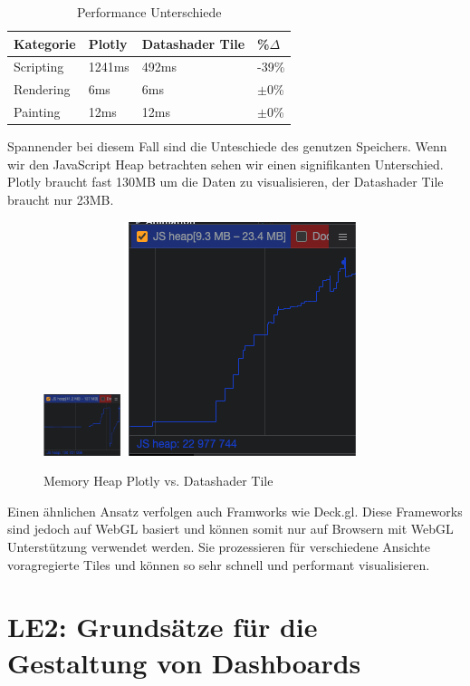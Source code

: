 \documentclass{article}
\begin{document}
\begin{table}[!h]
    \centering
    \begin{tabular}{|l|l|l|l|}
    \hline
    \textbf{Kategorie} & \textbf{Plotly} & \textbf{Datashader Tile} & \textbf{\%$\Delta$} \\
    \hline
    Scripting & 1241ms & 492ms & -39\% \\
    \hline
    Rendering & 6ms & 6ms & $\pm$0\% \\
    \hline
    Painting & 12ms & 12ms & $\pm$0\% \\
    \hline
    \end{tabular}
    \caption{\label{tab: LE1 Performance}Performance Unterschiede}
\end{table}
\noindent
Spannender bei diesem Fall sind die Unteschiede des genutzen Speichers. Wenn wir den JavaScript Heap betrachten sehen wir einen signifikanten Unterschied.\cite{noauthor_memory_2023}
Plotly braucht fast 130MB um die Daten zu visualisieren, der Datashader Tile braucht nur 23MB.

\begin{figure}[!h]
\centering
\includegraphics[width=0.2\textwidth]{img/js_heap_plotly.png}
\includegraphics[height=0.158\textwidth]{img/js_heap_datashader.png}
\caption{\label{fig: LE1 Datashader Memory} Memory Heap Plotly vs. Datashader Tile}
\end{figure}
\noindent
Einen ähnlichen Ansatz verfolgen auch Framworks wie Deck.gl. Diese Frameworks sind jedoch auf WebGL basiert und können somit nur auf Browsern mit WebGL Unterstützung verwendet werden.
Sie prozessieren für verschiedene Ansichte voragregierte Tiles und können so sehr schnell und performant visualisieren.\cite{deckgl_home_nodate}

\newpage

\section{LE2: Grundsätze für die Gestaltung von Dashboards}
\end{document}
